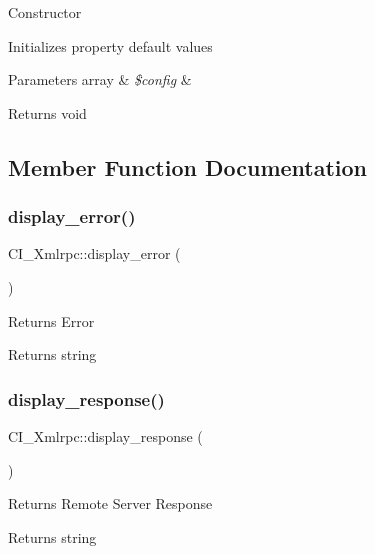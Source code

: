 Constructor

Initializes property default values


\begin{DoxyParams}[1]{Parameters}
array & {\em \$config} & \\
\hline
\end{DoxyParams}
\begin{DoxyReturn}{Returns}
void 
\end{DoxyReturn}


\subsection{Member Function Documentation}
\mbox{\label{class_c_i___xmlrpc_ae7cd0677aea4a271ea7920d706d61e8c}} 
\subsubsection{\texorpdfstring{display\+\_\+error()}{display\_error()}}
{\footnotesize\ttfamily C\+I\+\_\+\+Xmlrpc\+::display\+\_\+error (\begin{DoxyParamCaption}{ }\end{DoxyParamCaption})}

Returns Error

\begin{DoxyReturn}{Returns}
string 
\end{DoxyReturn}
\mbox{\label{class_c_i___xmlrpc_a23c437933e7812b2bada9af7069e4f51}} 
\subsubsection{\texorpdfstring{display\+\_\+response()}{display\_response()}}
{\footnotesize\ttfamily C\+I\+\_\+\+Xmlrpc\+::display\+\_\+response (\begin{DoxyParamCaption}{ }\end{DoxyParamCaption})}

Returns Remote Server Response

\begin{DoxyReturn}{Returns}
string 
\end{DoxyReturn}
\mbox{\label{class_c_i___xmlrpc_a83fa0b35866492f9a6fb8c092179a691}} 
